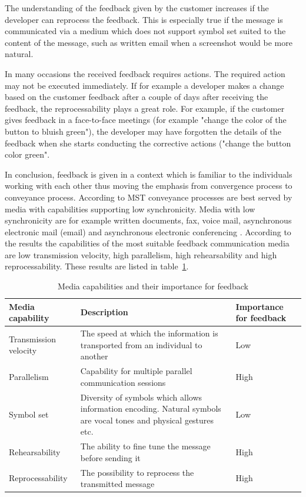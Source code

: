 \documentclass[english,12pt,a4paper,pdftex]{article}
\begin{document}
The understanding of the feedback given by the customer increases if the developer can reprocess the feedback. This is especially true if the message is communicated via a medium which does not support symbol set suited to the content of the message, such as written email when a screenshot would be more natural.

In many occasions the received feedback requires actions. The required action may not be executed immediately. If for example a developer makes a change based on the customer feedback after a couple of days after receiving the feedback, the reprocessability plays a great role. For example, if the customer gives feedback in a face-to-face meetings (for example "change the color of the button to bluish green"), the developer may have forgotten the details of the feedback when she starts conducting the corrective actions ("change the button color green".

In conclusion, feedback is given in a context which is familiar to the individuals working with each other thus moving the emphasis from convergence process to conveyance process. According to \ac{MST} conveyance processes are best served by media with capabilities supporting low synchronicity. Media with low synchronicity are for example written documents, fax, voice mail, asynchronous electronic mail (email) and asynchronous electronic conferencing \citep{dennis1999}. According to the results the capabilities of the most suitable feedback communication media are low transmission velocity, high parallelism, high rehearsability and high reprocessability. These results are listed in table~\ref{table:mst_feedback}.

\begin{table}[!h]
\renewcommand{\arraystretch}{1.3}
\caption{Media capabilities and their importance for feedback}
\label{table:mst_feedback}
\centering
\begin{tabular}{|p{4cm}|p{7cm}|p{3cm}|}
\hline
\textbf{Media capability} & \textbf{Description} & \textbf{Importance for feedback}\\
\hline
Transmission velocity & The speed at which the information is transported from an individual to another & Low \\
\hline
Parallelism & Capability for multiple parallel communication sessions & High \\
\hline
Symbol set & Diversity of symbols which allows information encoding. Natural symbols are vocal tones and physical gestures etc. & Low \\
\hline
Rehearsability & The ability to fine tune the message before sending it & High \\
\hline
Reprocessability & The possibility to reprocess the transmitted message & High \\
\hline
\end{tabular}
\end{table}
\end{document}

